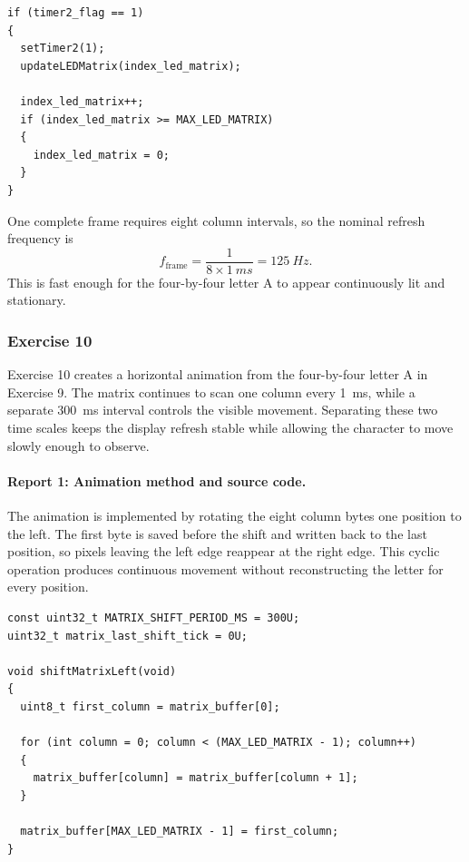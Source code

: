 \begin{lstlisting}[caption={Non-blocking matrix scan in the main loop}]
if (timer2_flag == 1)
{
  setTimer2(1);
  updateLEDMatrix(index_led_matrix);

  index_led_matrix++;
  if (index_led_matrix >= MAX_LED_MATRIX)
  {
    index_led_matrix = 0;
  }
}
\end{lstlisting}

One complete frame requires eight column intervals, so the nominal refresh
frequency is
\[
f_{\mathrm{frame}} = \frac{1}{8\times\SI{1}{ms}} = \SI{125}{Hz}.
\]
This is fast enough for the four-by-four letter A to appear continuously lit
and stationary.

\subsubsection{Exercise 10}

Exercise 10 creates a horizontal animation from the four-by-four letter A in
Exercise 9. The matrix continues to scan one column every \SI{1}{ms}, while a
separate \SI{300}{ms} interval controls the visible movement. Separating these
two time scales keeps the display refresh stable while allowing the character
to move slowly enough to observe.

\paragraph{Report 1: Animation method and source code.}

The animation is implemented by rotating the eight column bytes one position
to the left. The first byte is saved before the shift and written back to the
last position, so pixels leaving the left edge reappear at the right edge. This
cyclic operation produces continuous movement without reconstructing the
letter for every position.

\begin{lstlisting}[caption={Timing state and cyclic left shift for the letter A}]
const uint32_t MATRIX_SHIFT_PERIOD_MS = 300U;
uint32_t matrix_last_shift_tick = 0U;

void shiftMatrixLeft(void)
{
  uint8_t first_column = matrix_buffer[0];

  for (int column = 0; column < (MAX_LED_MATRIX - 1); column++)
  {
    matrix_buffer[column] = matrix_buffer[column + 1];
  }

  matrix_buffer[MAX_LED_MATRIX - 1] = first_column;
}
\end{lstlisting}


